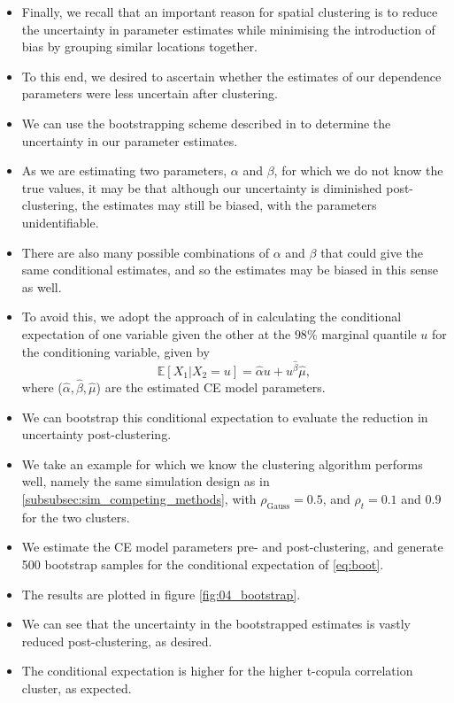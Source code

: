 \documentclass{article}
\numberwithin{equation}{section}
\begin{document}
\begin{itemize}
  \item Finally, we recall that an important reason for spatial clustering is to reduce the uncertainty in parameter estimates while minimising the introduction of bias by grouping similar locations together.
  \item To this end, we desired to ascertain whether the estimates of our dependence parameters were less uncertain after clustering.
  \item We can use the bootstrapping scheme described in \cite{Heffernan2004} to determine the uncertainty in our parameter estimates. 
  \item As we are estimating two parameters, $\alpha$ and $\beta$, for which we do not know the true values, it may be that although our uncertainty is diminished post-clustering, the estimates may still be biased, with the parameters unidentifiable.
  \item There are also many possible combinations of $\alpha$ and $\beta$ that could give the same conditional estimates, and so the estimates may be biased in this sense as well.
  \item To avoid this, we adopt the approach of \cite{Richards2021-qm} in calculating the conditional expectation of one variable given the other at the $98\%$ marginal quantile $u$ for the conditioning variable, given by
  \begin{equation} \label{eq:boot}
    \mathbb{E}[X_1 | X_2 = u] = \hat{\alpha} u + u^{\hat{\beta}} \hat{\mu},
  \end{equation}
  where ($\hat{\alpha}, \hat{\beta}, \hat{\mu}$) are the estimated CE model parameters.
  \item We can bootstrap this conditional expectation to evaluate the reduction in uncertainty post-clustering. 
\end{itemize}

\begin{itemize}
  \item We take an example for which we know the clustering algorithm performs well, namely the same simulation design as in \ref{subsubsec:sim_competing_methods}, with $\rho_{\text{Gauss}} = 0.5$, and $\rho_{t} = 0.1$ and $0.9$ for the two clusters.
  \item We estimate the CE model parameters pre- and post-clustering, and generate 500 bootstrap samples for  the conditional expectation of \ref{eq:boot}.
  \item The results are plotted in figure \ref{fig:04_bootstrap}.
  \item We can see that the uncertainty in the bootstrapped estimates is vastly reduced post-clustering, as desired.
  \item The conditional expectation is higher for the higher t-copula correlation cluster, as expected. 

\end{itemize}
\end{document}
